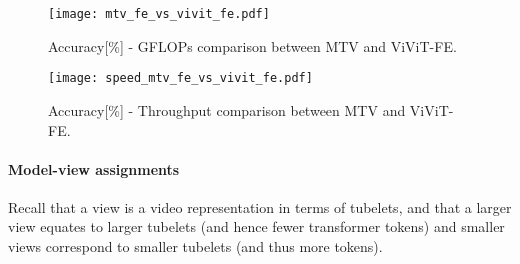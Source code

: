 \begin{figure*}
     \centering
     \begin{subfigure}[b]{0.47\textwidth}
         \centering
         \texttt{[image: mtv\_fe\_vs\_vivit\_fe.pdf]}
         \caption{Accuracy[\%] - GFLOPs comparison between MTV and ViViT-FE.}
         \label{fig:flops}
     \end{subfigure}
     \hfill
     \begin{subfigure}[b]{0.47\textwidth}
         \centering
         \texttt{[image: speed\_mtv\_fe\_vs\_vivit\_fe.pdf]}
        \caption{Accuracy[\%] - Throughput comparison between MTV and ViViT-FE.}
         \label{fig:latency}
     \end{subfigure}
        \caption{
        Accuracy/computation trade-off between ViViT-FE~\cite{arnab2021vivit} (blue) and our MTV (red). Figure~\ref{fig:flops} shows that MTV is consistently better and requires less FLOPs than ViViT-FE to achieve higher accuracy across different model scales (shown by the dotted green arrows pointing upper-left). With additional FLOPs, MTV shows larger accuracy gains (shown by the dotted green arrows pointing upper-right).
        Similarly, Fig.~\ref{fig:latency} shows that MTV can have higher throughput than ViVIT-FE, whilst still improving its accuracy, across all model scales.
        All speed comparisons are measured with the same hardware (Cloud TPU-v4), whilst the accuracy is computed from  view testing.
        }
        \label{fig:accuracy/complexity tradeoff}
    \label{fig:comparison_to_vivit}
    \vspace{-\baselineskip}
\end{figure*}



\iffalse
\begin{figure}[t]
    \centering
\texttt{[image: mtv\_fe\_vs\_vivit\_fe.pdf]}
    \vspace{-0.5\baselineskip}
    \caption{Accuracy/complexity trade-off between ViViT-FE~\cite{arnab2021vivit} (blue) and our MTV (red).
    MTV is consistently better and requires less FLOPs than ViViT-FE to achieve higher accuracy across different model scales
    (indicated by the dotted green arrows pointing upper-left).
    With additional FLOPs, MTV shows larger accuracy gains (shown by the dotted green arrows pointing upper-right).
    }
	\label{fig:comparison_to_vivit}
\end{figure} 
\fi 
\paragraph{Model-view assignments}
Recall that a view is a video representation in terms of tubelets, and that a larger view equates to larger tubelets (and hence fewer transformer tokens) and smaller views correspond to smaller tubelets (and thus more tokens).

